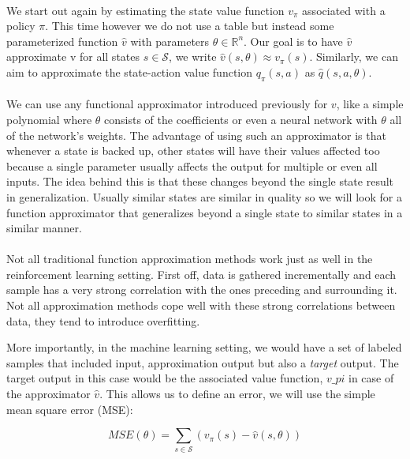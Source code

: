 \paragraph{}
We start out again by estimating the state value function $v_\pi$
associated with a policy $\pi$.
This time however we do not use a table but instead
some parameterized function $\hat{v}$ with parameters $\theta \in \mathbb{R}^n$.
Our goal is to have $\hat{v}$ approximate v for all states $s \in \mathcal{S}$,
we write
$\hat{v}(s, \theta) \approx v_\pi(s)$.
Similarly,
we can aim to approximate the state-action value function $q_\pi(s,a)$
as $\hat{q}(s, a, \theta)$.

\paragraph{}
We can use any functional approximator introduced previously for $v$,
like a simple polynomial where $\theta$
consists of the coefficients
or even a neural network with $\theta$ all of the network's weights.
The advantage of using such an approximator
is that whenever a state is backed up,
other states will have their values affected too
because a single parameter usually affects the output for
multiple or even all inputs.
The idea behind this is that these changes beyond the single state
result in generalization.
Usually similar states are similar in quality
so we will look for a function approximator
that generalizes beyond a single state to similar states
in a similar manner.

\paragraph{}
Not all traditional function approximation methods work
just as well in the reinforcement learning setting.
First off, data is gathered incrementally
and each sample has a very strong correlation
with the ones preceding and surrounding it.
Not all approximation methods cope well with these
strong correlations between data,
they tend to introduce overfitting.

More importantly, in the machine learning setting,
we would have a set of labeled samples
that included input, approximation output
but also a \textit{target} output.
The target output in this case would be the associated value function,
$v\_pi$ in case of the approximator $\hat{v}$.
This allows us to define an error,
we will use the simple mean square error (MSE):

\begin{equation}
  MSE(\theta) = \sum_{s \in \mathcal{S}} \left( v_\pi(s) - \hat{v}(s, \theta) \right )
\end{equation}

